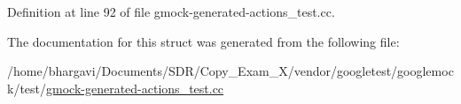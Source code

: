 Definition at line 92 of file gmock-\/generated-\/actions\+\_\+test.\+cc.



The documentation for this struct was generated from the following file\+:\begin{DoxyCompactItemize}
\item 
/home/bhargavi/\+Documents/\+S\+D\+R/\+Copy\+\_\+\+Exam\+\_\+X/vendor/googletest/googlemock/test/\hyperlink{gmock-generated-actions__test_8cc}{gmock-\/generated-\/actions\+\_\+test.\+cc}\end{DoxyCompactItemize}
